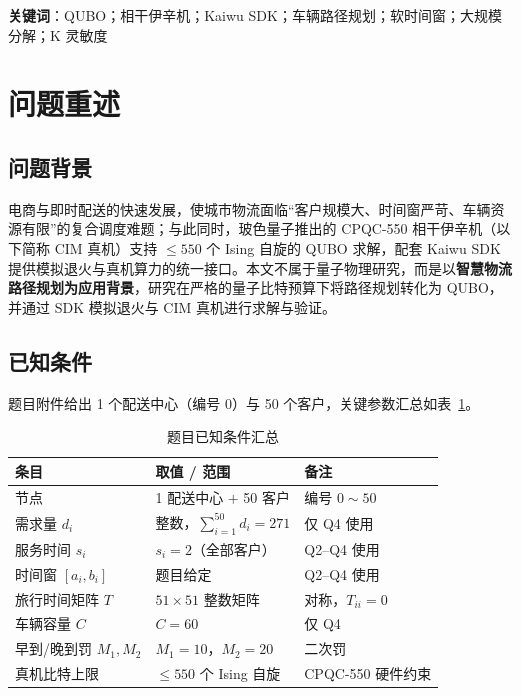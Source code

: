 \documentclass[UTF8,12pt,a4paper]{ctexart}
\begin{document}
\vspace{0.6em}
\noindent\textbf{关键词}：QUBO；相干伊辛机；Kaiwu SDK；车辆路径规划；软时间窗；大规模分解；K 灵敏度

\newpage

\section{问题重述}

\subsection{问题背景}

电商与即时配送的快速发展，使城市物流面临``客户规模大、时间窗严苛、车辆资源有限''的复合调度难题；与此同时，玻色量子推出的 CPQC-550 相干伊辛机（以下简称 CIM 真机）支持 $\le 550$ 个 Ising 自旋的 QUBO 求解，配套 Kaiwu SDK 提供模拟退火与真机算力的统一接口。本文不属于量子物理研究，而是以\textbf{智慧物流路径规划为应用背景}，研究在严格的量子比特预算下将路径规划转化为 QUBO，并通过 SDK 模拟退火与 CIM 真机进行求解与验证。

\subsection{已知条件}

题目附件给出 1 个配送中心（编号 0）与 50 个客户，关键参数汇总如表~\ref{tab:given}。

\begin{table}[H]
    \centering
    \caption{题目已知条件汇总}
    \label{tab:given}
    \begin{tabular}{l l l}
        \toprule
        条目 & 取值 / 范围 & 备注 \\
        \midrule
        节点                  & 1 配送中心 $+$ 50 客户            & 编号 $0\sim50$ \\
        需求量 $d_i$           & 整数，$\sum_{i=1}^{50}d_i=271$    & 仅 Q4 使用 \\
        服务时间 $s_i$         & $s_i=2$（全部客户）               & Q2--Q4 使用 \\
        时间窗 $[a_i,b_i]$     & 题目给定                          & Q2--Q4 使用 \\
        旅行时间矩阵 $T$       & $51\!\times\!51$ 整数矩阵          & 对称，$T_{ii}=0$ \\
        车辆容量 $C$          & $C=60$                            & 仅 Q4 \\
        早到/晚到罚 $M_1,M_2$  & $M_1=10$，$M_2=20$               & 二次罚 \\
        真机比特上限           & $\le 550$ 个 Ising 自旋           & CPQC-550 硬件约束 \\
        \bottomrule
    \end{tabular}
\end{table}
\end{document}
